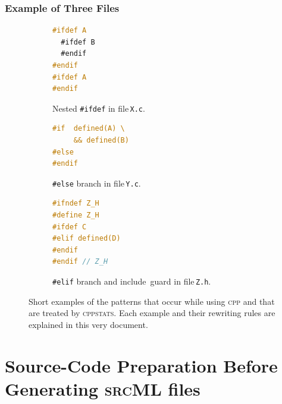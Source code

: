 \documentclass{beamer}
\newcommand\code[1]{\texttt{#1}}
\newcommand\tool[1]{\textsc{#1}}
\newcommand\ifdeff[1]{\code{\##1}\xspace}
\newcommand\ifdef[0]{{\upshape\ifdeff{ifdef}}\xspace}
\newcommand\cppstats[0]{\tool{cppstats}\xspace}
\newcommand\cpp{\tool{cpp}\xspace}
\begin{document}
  
\begin{frame}[fragile]
\frametitle{Example of Three Files}


\begin{figure}[ht]
        \centering
        \small
        \begin{subfigure}[b]{0.3\textwidth}
					\begin{lstlisting}[language=C]
#ifdef A
  #ifdef B
  #endif
#endif
#ifdef A
#endif
					\end{lstlisting}
					\caption{Nested \ifdef in file\,\code{X.c}.\vspace{1.15em}}
					\label{fig:examples:a}
        \end{subfigure}
        \hfill
        \begin{subfigure}[b]{0.3\textwidth}
					\begin{lstlisting}[language=C, firstnumber=5]
#if  defined(A) \
     && defined(B)
#else 
#endif
					\end{lstlisting}
					\caption{\ifdeff{else} branch in file\,\code{Y.c}.\vspace{1.15em}}
					\label{fig:examples:b}
        \end{subfigure}
				\hfill
        \begin{subfigure}[b]{0.3\textwidth}
					\begin{lstlisting}[language=C, firstnumber=8]
#ifndef Z_H
#define Z_H
#ifdef C
#elif defined(D)
#endif
#endif // Z_H
					\end{lstlisting}
					\caption{\ifdeff{elif} branch and include~guard in file\,\code{Z.h}.}
					\label{fig:examples:c}
        \end{subfigure}     
        
        \caption{Short examples of the patterns that occur while using \cpp and that are treated by \cppstats. 
        	Each example and their rewriting rules are explained in this very document.}
        \label{fig:examples}
\end{figure}


\end{frame}


\section[Preparation]{Source-Code Preparation Before Generating \tool{srcML} files}
\stepcounter{subsection}
\end{document}
